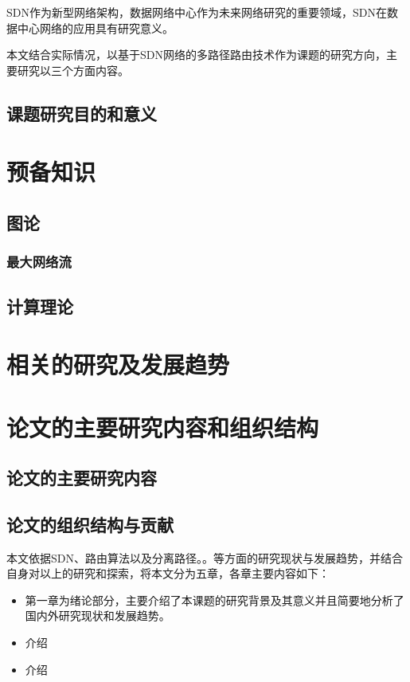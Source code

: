 SDN作为新型网络架构，数据网络中心作为未来网络研究的重要领域，SDN在数据中心网络的应用具有研究意义。

本文结合实际情况，以基于SDN网络的多路径路由技术作为课题的研究方向，主要研究以三个方面内容。


\subsection{课题研究目的和意义}


\section{预备知识}
\subsection{图论}
\subsubsection{最大网络流}
\subsection{计算理论}

\section{相关的研究及发展趋势}
\section{论文的主要研究内容和组织结构}
\subsection{论文的主要研究内容}
\subsection{论文的组织结构与贡献}
本文依据SDN、路由算法以及分离路径。。等方面的研究现状与发展趋势，并结合自身对以上的研究和探索，将本文分为五章，各章主要内容如下：
\begin{itemize}
  \item 第一章为绪论部分，主要介绍了本课题的研究背景及其意义并且简要地分析了国内外研究现状和发展趋势。
  \item 介绍
  \item 介绍
\end{itemize}


